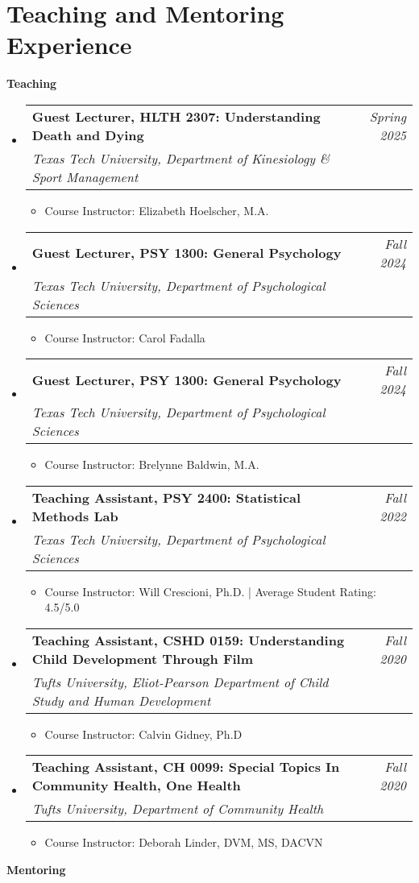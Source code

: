 \documentclass[letter,11pt]{article}
\makeatletter
\newcommand{\resumeSubheading}[4]{
\vspace{0.5mm}\item
    \begin{tabular*}{0.98\textwidth}[t]{l@{\extracolsep{\fill}}r}
        \textbf{#1} & \textit{\footnotesize{#4}} \\
        \textit{\footnotesize{#3}} &  \footnotesize{#2}\\
    \end{tabular*}
    \vspace{-2.4mm}
}
\newcommand{\resumeSubHeadingListStart}{\begin{itemize}[leftmargin=*,labelsep=1mm]}
\newcommand{\resumeItemListStart}{\begin{itemize}[leftmargin=*,labelsep=1mm,itemsep=0.5mm]}
\newcommand{\resumeSubHeadingListEnd}{\end{itemize}\vspace{2mm}}
\newcommand{\resumeItemListEnd}{\end{itemize}\vspace{-2mm}}
\makeatother
\begin{document}
\vspace{-6mm}

\section{\textbf{Teaching and Mentoring Experience}}
\vspace{-0.4mm}
\vspace{1mm}

\textbf{Teaching}
\vspace{-3mm}

  \resumeSubHeadingListStart
    \resumeSubheading
      {Guest Lecturer, HLTH 2307: Understanding Death and Dying}{}
      {Texas Tech University, Department of Kinesiology \& Sport Management}{Spring 2025}
      \resumeItemListStart
        \item Course Instructor: Elizabeth Hoelscher, M.A.
    \resumeItemListEnd
    \resumeSubheading
      {Guest Lecturer, PSY 1300: General Psychology}{}
      {Texas Tech University, Department of Psychological Sciences}{Fall 2024}
      \resumeItemListStart
        \item Course Instructor: Carol Fadalla
    \resumeItemListEnd
    \resumeSubheading
      {Guest Lecturer, PSY 1300: General Psychology}{}
      {Texas Tech University, Department of Psychological Sciences}{Fall 2024}
      \resumeItemListStart
        \item Course Instructor: Brelynne Baldwin, M.A.
    \resumeItemListEnd
    \resumeSubheading
      {Teaching Assistant, PSY 2400: Statistical Methods Lab}{}
      {Texas Tech University, Department of Psychological Sciences}{Fall 2022}
      \resumeItemListStart
        \item Course Instructor: Will Crescioni, Ph.D. | Average Student Rating: 4.5/5.0
    \resumeItemListEnd
    \resumeSubheading
      {Teaching Assistant, CSHD 0159: Understanding Child Development Through Film}{}
      {Tufts University, Eliot-Pearson Department of Child Study and Human Development}{Fall 2020}
      \resumeItemListStart
        \item Course Instructor: Calvin Gidney, Ph.D
    \resumeItemListEnd
    \resumeSubheading
      {Teaching Assistant, CH 0099: Special Topics In Community Health, One Health}{}
      {Tufts University, Department of Community Health}{Fall 2020}
      \resumeItemListStart
        \item Course Instructor: Deborah Linder, DVM, MS, DACVN
    \resumeItemListEnd
    \resumeSubHeadingListEnd
\vspace{-3mm}
\textbf{Mentoring}
\vspace{-3mm}
\end{document}
